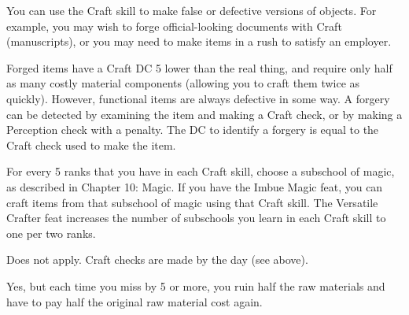  You can use the Craft skill to make false or defective versions of objects. For example, you may wish to forge official-looking documents with Craft (manuscripts), or you may need to make items in a rush to satisfy an employer. 

Forged items have a Craft DC 5 lower than the real thing, and require only half as many costly material components (allowing you to craft them twice as quickly). However, functional items are always defective in some way. A forgery can be detected by examining the item and making a Craft check, or by making a Perception check with a  penalty. The DC to identify a forgery is equal to the Craft check used to make the item.

 For every 5 ranks that you have in each Craft skill, choose a subschool of magic, as described in Chapter 10: Magic. If you have the Imbue Magic feat, you can craft items from that subschool of magic using that Craft skill. The Versatile Crafter feat increases the number of subschools you learn in each Craft skill to one per two ranks.

 Does not apply. Craft checks are made by the day (see above).

 Yes, but each time you miss by 5 or more, you ruin half the raw materials and have to pay half the original raw material cost again.

